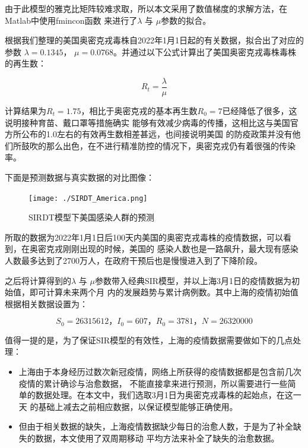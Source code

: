 \documentclass[bwprint]{gmcmthesis}
\numberwithin{figure}{section}
\begin{document}
\par 由于此模型的雅克比矩阵较难求取，所以本文采用了数值梯度的求解方法，在Matlab中使用fmincon函数
来进行了$\lambda$ 与 $\mu$参数的拟合。

\par 根据我们整理的美国奥密克戎毒株自2022年1月1日起的有关数据，拟合出了对应的参数
$\lambda = 0.1345$， $\mu = 0.0768$。并通过以下公式计算出了美国奥密克戎毒株毒株的再生数：

\begin{equation}
    R_t=\dfrac{\lambda}{\mu}
\end{equation}

\par 计算结果为$R_t=1.75$，相比于奥密克戎的基本再生数$R_0=7$已经降低了很多，这说明接种育苗、戴口罩等措施确实
能够有效减少病毒的传播，这相比这与美国官方所公布的1.0左右的有效再生数相差甚远，也间接说明美国
的防疫政策并没有他们所鼓吹的那么出色，在不进行精准防控的情况下，奥密克戎仍有着很强的传染率。
\par 下面是预测数据与真实数据的对比图像：

\begin{figure}[!h]
    \centering
    \texttt{[image: ./SIRDT\_America.png]}
    \caption{SIRDT模型下美国感染人群的预测}
    \label{fig1}
\end{figure}

\par 所取的数据为2022年1月1日后100天内美国的奥密克戎毒株的疫情数据，可以看到，在奥密克戎刚刚出现的时候，美国的
感染人数也是一路飙升，最大现有感染人数最多达到了2700万人，在政府干预后也是慢慢进入到了下降阶段。
\par 之后将计算得到的$\lambda$ 与 $\mu$参数带入经典SIR模型，并以上海3月1日的疫情数据为初始值，即可计算未来两个月
内的发展趋势与累计病例数。其中上海的疫情初始值根据相关数据设置为：

\begin{equation}
    S_0=26315612\text{，}I_0=607\text{，}R_0=3781\text{，}N=26320000
\end{equation}


\par 值得一提的是，为了保证SIR模型的有效性，上海的疫情数据需要做如下的几点处理：
\begin{itemize}
    \item 上海由于本身经历过数次新冠疫情，网络上所获得的疫情数据都是包含前几次疫情的累计确诊与治愈数据，
不能直接拿来进行预测，所以需要进行一些简单的数据处理。在本文中，我们选取3月1日为奥密克戎毒株的起始点，在这一天
的基础上减去之前相应数据，以保证模型能够正确使用。
    \item 但由于相关数据的缺失，上海疫情数据缺少每日的治愈人数，于是为了补全缺失的数据，本文使用了双周期移动
平均方法来补全了缺失的治愈数据。
\end{itemize}
\end{document}
